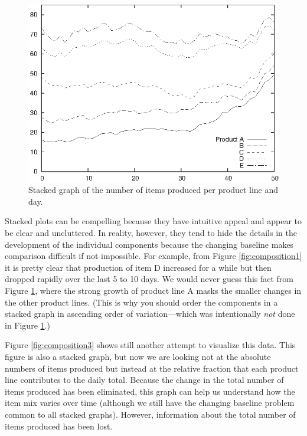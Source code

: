 \begin{figure}
  \centerline{\includegraphics{img/composition2}}
  \caption{Stacked graph of the number of items produced per product
    line and day.}
  \label{fig:composition2}
\end{figure}

Stacked plots can be compelling because they have intuitive appeal and
appear to be clear and uncluttered. In reality, however,\vadjust{\pagebreak} they tend to
hide the details in the development of the individual components
because the changing baseline makes comparison difficult if not
impossible.  For example, from Figure \ref{fig:composition1} it is
pretty clear that production of item D increased for a while but then
dropped rapidly over the last 5 to 10 days. We would never guess this
fact from Figure \ref{fig:composition2}, where the strong growth of
product line A masks the smaller changes in the other product lines.
(This is why you should order the components in a stacked graph in
ascending order of variation---which was intentionally \emph{not} done
in Figure \ref{fig:composition2}.)

Figure \ref{fig:composition3} shows still another attempt to visualize
this data. This figure is also a stacked graph, but now we are looking
not at the absolute numbers of items produced but instead at the
relative fraction that each product line contributes to the daily
total. Because the change in the total number of items produced has
been eliminated, this graph can help us understand how the item mix
varies over time (although we still have the changing baseline problem
common to all stacked graphs). However, information about the total
number of items produced has been lost.

